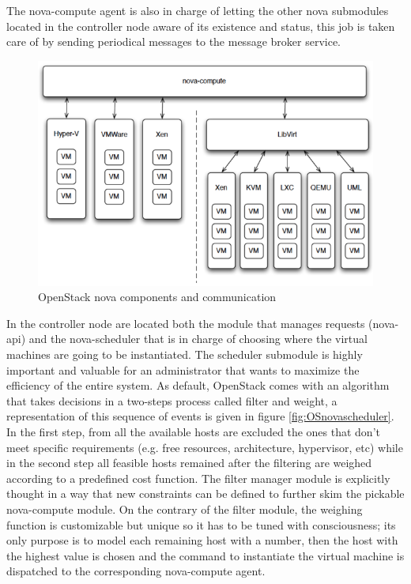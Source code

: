 The nova-compute agent is also in charge of letting the other nova submodules located in the controller node aware of its existence and status, this job is taken care of by sending periodical messages to the message broker service.
\begin{figure}[h]
	\centering
	\includegraphics[clip= true, width= \columnwidth]{images/nova-compute.png}
	\caption{OpenStack nova components and communication}
	\label{fig:OSnovacompute}
\end{figure}
In the controller node are located both the module that manages requests (nova-api) and the nova-scheduler that is in charge of choosing where the virtual machines are going to be instantiated.
The scheduler submodule is highly important and valuable for an administrator that wants to maximize the efficiency of the entire system.
As default, OpenStack comes with an algorithm that takes decisions in a two-steps process called filter and weight, a representation of this sequence of events is given in figure \ref{fig:OSnovascheduler}.
In the first step, from all the available hosts are excluded the ones that don't meet specific requirements (e.g. free resources, architecture, hypervisor, etc) while in the second step all feasible hosts remained after the filtering are weighed according to a predefined cost function. The filter manager module is explicitly thought in a way that new constraints can be defined to further skim the pickable nova-compute module.
On the contrary of the filter module, the weighing function is customizable but unique so it has to be tuned with consciousness; its only purpose is to model each remaining host with a number, then the host with the highest value is chosen and the command to instantiate the virtual machine is dispatched to the corresponding nova-compute agent.
